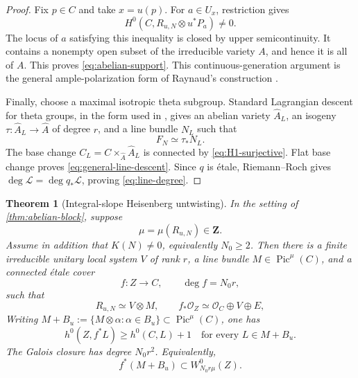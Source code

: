\documentclass[11pt,reqno]{amsart}
\numberwithin{equation}{section}
\newtheorem{theorem}{Theorem}[section]
\theoremstyle{remark}
\DeclareMathOperator{\Pic}{Pic}
\newcommand{\cO}{\mathcal O}
\newcommand{\bZ}{\mathbf Z}
\begin{document}
\begin{proof}
Fix \(p\in C\) and take \(x=u(p)\).  For \(a\in U_x\), restriction gives
\[
 H^0(C,R_{u,N}\otimes u^*P_a)\neq0.
\]
The locus of \(a\) satisfying this inequality is closed by upper
semicontinuity.  It contains a nonempty open subset of the irreducible
variety \(A\), and hence it is all of \(A\).  This proves
\eqref{eq:abelian-support}.  This continuous-generation argument is the
general ample-polarization form of Raynaud's construction
\cite[\S3]{Raynaud}.

Finally, choose a maximal isotropic theta subgroup.  Standard
Lagrangian descent for theta groups, in the form used in
\cite[Proposition 2.1(2)]{Schneider}, gives an abelian variety
\(\widehat A_L\), an isogeny
\(\tau\colon\widehat A_L\to\widehat A\) of degree \(r\), and a line
bundle \(N_L\) such that
\[
 F_N\simeq\tau_*N_L.
\]
The base change \(C_L=C\times_{\widehat A}\widehat A_L\) is connected by
\eqref{eq:H1-surjective}.  Flat base change proves
\eqref{eq:general-line-descent}.  Since \(q\) is \'etale,
Riemann--Roch gives \(\deg\mathcal L=\deg q_*\mathcal L\), proving
\eqref{eq:line-degree}.
\end{proof}

\begin{theorem}[Integral-slope Heisenberg untwisting]\label{thm:general-untwisting}
In the setting of \cref{thm:abelian-block}, suppose
\[
 \mu=\mu(R_{u,N})\in\bZ.
\tag{8.12}\label{eq:integral-slope}
\]
Assume in addition that \(K(N)\neq0\), equivalently \(N_0\geq2\).
Then there is a finite irreducible unitary local system \(V\) of rank
\(r\), a line bundle \(M\in\Pic^\mu(C)\), and a connected \'etale cover
\[
 f\colon Z\longrightarrow C,\qquad \deg f=N_0r,
\tag{8.13}\label{eq:general-cover-degree}
\]
such that
\[
 R_{u,N}\simeq V\otimes M,\qquad
 f_*\cO_Z\simeq\cO_C\oplus V\oplus E,
\tag{8.14}\label{eq:general-splitting}
\]
Writing
\(M+B_u:=\{M\otimes\alpha:\alpha\in B_u\}\subset\Pic^\mu(C)\), one has
\[
 h^0(Z,f^*L)\geq h^0(C,L)+1
\quad\text{for every }L\in M+B_u.
\tag{8.15}\label{eq:block-pullback-sections}
\]
The Galois closure has degree \(N_0r^2\).  Equivalently,
\[
 f^*(M+B_u)\subset W_{N_0r\mu}^0(Z).
\tag{8.16}\label{eq:rank-one-block}
\]
\end{theorem}
\end{document}

